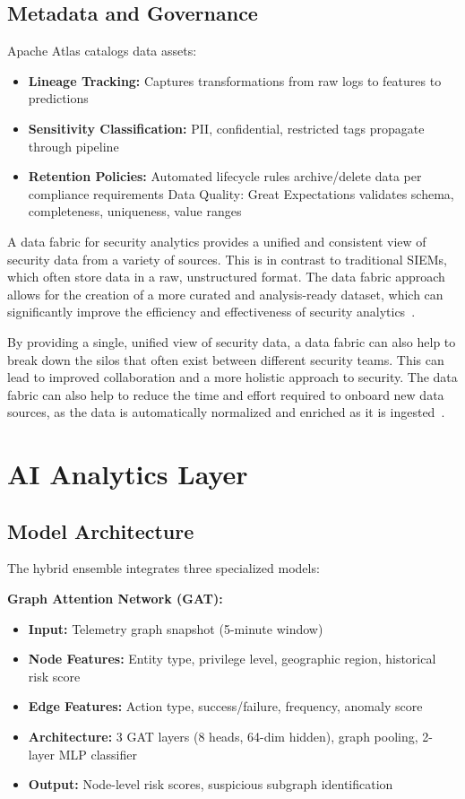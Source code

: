 \subsection{Metadata and Governance}
Apache Atlas catalogs data assets:
\begin{itemize}
    \item \textbf{Lineage Tracking:} Captures transformations from raw logs to features to predictions
    \item \textbf{Sensitivity Classification:} PII, confidential, restricted tags propagate through pipeline
    \item \textbf{Retention Policies:} Automated lifecycle rules archive/delete data per compliance requirements
Data Quality: Great Expectations validates schema, completeness, uniqueness, value ranges
\end{itemize}

A data fabric for security analytics provides a unified and consistent view of security data from a variety of sources. This is in contrast to traditional SIEMs, which often store data in a raw, unstructured format. The data fabric approach allows for the creation of a more curated and analysis-ready dataset, which can significantly improve the efficiency and effectiveness of security analytics~\cite{zscaler2024fabric}.

By providing a single, unified view of security data, a data fabric can also help to break down the silos that often exist between different security teams. This can lead to improved collaboration and a more holistic approach to security. The data fabric can also help to reduce the time and effort required to onboard new data sources, as the data is automatically normalized and enriched as it is ingested~\cite{databee2024siem}.

\section{AI Analytics Layer}\label{sec:arch-aianalytics}
\subsection{Model Architecture}
The hybrid ensemble integrates three specialized models:

\textbf{Graph Attention Network (GAT):}
\begin{itemize}
    \item \textbf{Input:} Telemetry graph snapshot (5-minute window)
    \item \textbf{Node Features:} Entity type, privilege level, geographic region, historical risk score
    \item \textbf{Edge Features:} Action type, success/failure, frequency, anomaly score
    \item \textbf{Architecture:} 3 GAT layers (8 heads, 64-dim hidden), graph pooling, 2-layer MLP classifier
    \item \textbf{Output:} Node-level risk scores, suspicious subgraph identification
\end{itemize}

